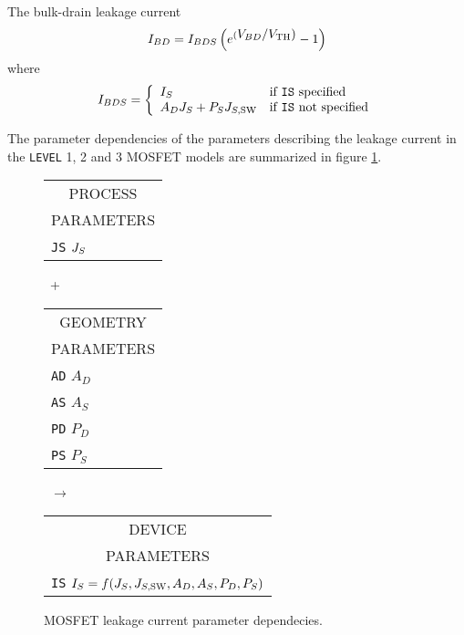 The bulk-drain leakage current
\begin{equation}
I_{BD} = I_{BDS}\left( e^{(\textstyle V_{BD}/V_{\mbox{\scriptsize TH}})} -1\right)
\label{eqn:m:ibd}
\end{equation}
where
\begin{equation}
I_{BDS} = \left\{ \begin{array}{ll}
         I_S       & \mbox{if {\tt IS} specified} \\
         A_D J_S   + \PS\JSSW & \mbox{if {\tt IS} not specified}
         \end{array} \right. %
\end{equation}
{The parameter dependencies of the parameters describing the leakage
current
in the {\tt LEVEL} 1, 2 and 3 MOSFET models are summarized in
figure \ref{mlevel123leakage}.\\[0.2in]
\begin{figure}
\begin{tabular}[t]{|p{1in}|}
\hline
\multicolumn{1}{|c|}{PROCESS} \\
\multicolumn{1}{|c|}{PARAMETERS} \\
\hline
\hline
{\tt JS} \hfill $J_S$\\
\hline
\end{tabular}
\hfill
\parbox{0.1in}{\ \vspace*{0.2in}\newline +}
\hfill
\begin{tabular}[t]{|p{1in}|}
\hline
\multicolumn{1}{|c|}{GEOMETRY} \\
\multicolumn{1}{|c|}{PARAMETERS} \\
\hline
{\tt AD} \hfill $A_D$\\
{\tt AS} \hfill $A_S$\\
{\tt PD} \hfill $P_D$\\
{\tt PS} \hfill $P_S$\\
\hline
\end{tabular}
\hfill
\parbox{0.1in}{\ \vspace*{0.2in}\newline $\rightarrow$}
\hfill
\begin{tabular}[t]{|p{1.8in}|}
\hline
\multicolumn{1}{|c|}{DEVICE} \\
\multicolumn{1}{|c|}{PARAMETERS} \\
\hline
{\tt IS} \hfill $I_S = f(J_S, J_{S,{\mbox{\scriptsize SW}}}, A_D, A_S, P_D, P_S)$\\
\hline
\end{tabular}
\caption{MOSFET leakage current parameter dependecies. \label{mlevel123leakage}}
\end{figure}
}

